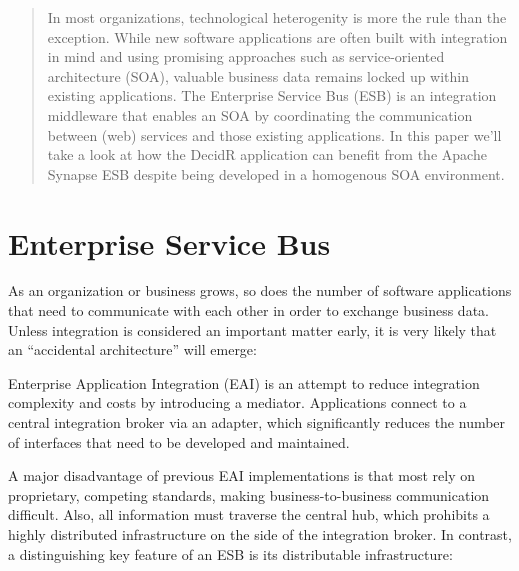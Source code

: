 \begin{abstract}
In most organizations, technological heterogenity is more the rule than the
exception. While new software applications are often built with integration in
mind and using promising approaches such as service-oriented architecture (SOA), valuable
business data remains locked up within existing applications. The Enterprise
Service Bus (ESB) is an integration middleware that enables an SOA by
coordinating the communication between (web) services and those existing
applications. In this paper we'll take a look at how the DecidR application can
benefit from the Apache Synapse ESB despite being developed in a
homogenous SOA environment. 
\end{abstract}

\section{Enterprise Service Bus}
\label{chap:enterprise-service-bus}
As an organization or business grows, so does the number of software applications
that need to communicate with each other in order to exchange business data.
Unless integration is considered an important matter early, it is very likely
that an ``accidental architecture'' will emerge:


Enterprise Application Integration (EAI) is an attempt to reduce integration
complexity and costs by introducing a mediator. Applications connect to a central
integration broker via an adapter, which significantly reduces the
number of interfaces that need to be developed and maintained.


A major disadvantage of previous EAI implementations is that most rely on
proprietary, competing standards, making business-to-business communication
difficult. Also, all information must traverse the central hub, which prohibits
a highly distributed infrastructure on the side of the integration broker.
In contrast, a distinguishing key feature of an ESB is its
distributable infrastructure:

